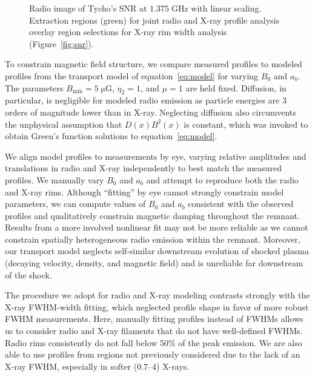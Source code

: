 \documentclass[manuscript]{aastex}  %
\newcommand*{\mt}{\mathrm}
\newcommand*{\unit}[1]{\;\mt{#1}}  %
\newcommand*{\muG}{\unit{\mu G}}
\begin{document}
\begin{figure}
    \centering
    \caption{Radio image of Tycho's SNR at $1.375 \unit{GHz}$ with linear
    scaling.  Extraction regions (green) for joint radio and X-ray profile
    analysis overlay region selections for X-ray rim width analysis
    (Figure~\ref{fig:snr}). \label{fig:radio-snr}}
\end{figure}

To constrain magnetic field structure, we compare measured profiles to modeled
profiles from the transport model of equation~\eqref{eq:model} for varying
$B_0$ and $a_b$.  The parameters $B_{\mt{min}} = 5 \muG$, $\eta_2 = 1$, and
$\mu = 1$ are held fixed.  Diffusion, in particular, is negligible for modeled
radio emission as particle energies are 3 orders of magnitude lower than in
X-ray.  Neglecting diffusion also circumvents the unphysical assumption that
$D(x) B^2(x)$ is constant, which was invoked to obtain Green's function
solutions to equation~\eqref{eq:model}.

We align model profiles to measurements by eye, varying relative amplitudes and
translations in radio and X-ray independently to best match the measured
profiles.  We manually vary $B_0$ and $a_b$ and attempt to reproduce both the
radio and X-ray rims.  Although ``fitting'' by eye cannot strongly constrain
model parameters, we can compute values of $B_0$ and $a_b$ consistent with the
observed profiles and qualitatively constrain magnetic damping throughout the
remnant.  Results from a more involved nonlinear fit may not be more reliable
as we cannot constrain spatially heterogeneous radio emission within
the remnant.  Moreover, our transport model neglects self-similar downstream
evolution of shocked plasma (decaying velocity, density, and magnetic field)
and is unreliable far downstream of the shock.

The procedure we adopt for radio and X-ray modeling contrasts strongly with the
X-ray FWHM-width fitting, which neglected profile shape in favor of more robust
FWHM measurements.  Here, manually fitting profiles instead of FWHMs allows us
to consider radio and X-ray filaments that do not have well-defined FWHMs.
Radio rims consistently do not fall below 50\% of the peak emission.  We are
also able to use profiles from regions not previously considered due to the
lack of an X-ray FWHM, especially in softer ($0.7$--$4$) X-rays.
\end{document}

